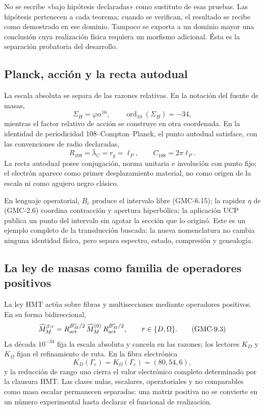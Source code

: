 No se escribe «bajo hipótesis declaradas» como sustituto de esas pruebas. Las
hipótesis pertenecen a cada teorema; cuando se verifican, el
resultado se recibe como demostrado en ese dominio. Tampoco se exporta a un
dominio mayor una conclusión cuya realización física requiera un morfismo
adicional. Ésta es la separación probatoria del desarrollo.

\subsection{Planck, acción y la recta autodual}

La escala absoluta se separa de las razones relativas. En la notación del
fuente de masas,
\[
 \Sigma_H=\varphi\alpha^{16},
 \qquad \operatorname{ord}_{10}(\Sigma_H)=-34,
 \tag{GMC-9.1}
\]
mientras el factor relativo de acción se construye en otra coordenada. En la
identidad de periodicidad 108--Compton--Planck, el punto autodual satisface, con las
convenciones de radio declaradas,
\[
 R_{108}=\bar\lambda_C=r_g=\ell_P,
 \qquad C_{108}=2\pi\ell_P.
 \tag{GMC-9.2}
\]
La recta autodual posee conjugación, norma unitaria e involución con punto
fijo; el electrón aparece como primer desplazamiento material, no como origen
de la escala ni como agujero negro clásico.

En lenguaje operatorial, $B_c$ produce el intervalo libre
\textup{(GMC-6.15)}; la rapidez $\eta$ de \textup{(GMC-2.6)} coordina contracción y
apertura hiperbólica; la aplicación UCP publica un punto del intervalo sin
agotar la sección que lo originó. Este es un ejemplo completo de la
transducción buscada: la nueva nomenclatura no cambia ninguna identidad
física, pero separa espectro, estado, compresión y genealogía.

\subsection{La ley de masas como familia de operadores positivos}

La ley HMT actúa sobre fibras y multisecciones mediante operadores positivos.
En su forma bidireccional,
\[
 \widehat M_{M}^{\beta,r}
 =R_{\rm act}^{B_M^r/2}\,
  \widehat M_M^{(0)}\,
  R_{\rm act}^{B_M^r/2},
 \qquad r\in\{D,\Omega\}.
 \tag{GMC-9.3}
\]
La década $10^{-34}$ fija la escala absoluta y cancela en las razones; los
lectores $K_D$ y $K_\Omega$ fijan el refinamiento de ruta. En la fibra
electrónica
\[
 K_D(\Gamma_e)=K_\Omega(\Gamma_e)=(80,54,6),
 \tag{GMC-9.4}
\]
y la reducción de rango uno cierra el valor electrónico completo determinado
por la clausura HMT. Las clases nulas, escalares, operatoriales y no comparables
como masa escalar permanecen separadas: una matriz positiva no se convierte
en un número experimental hasta declarar el funcional de realización.

